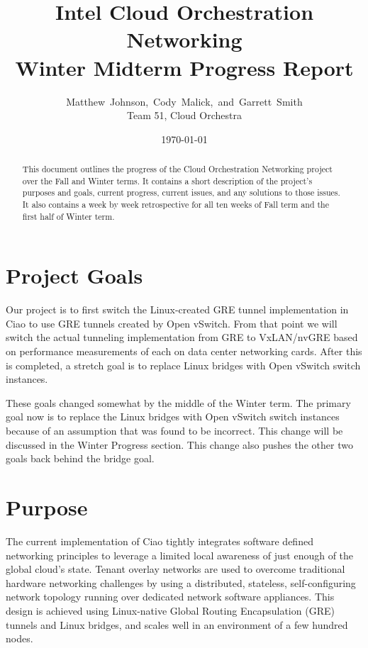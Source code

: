 \documentclass[10pt,onecolumn,journal,draftclsnofoot]{IEEEtran}
\begin{document}
\begin{titlepage}
	\title{Intel Cloud Orchestration Networking\\ Winter Midterm Progress Report}
	\author{Matthew~Johnson,~Cody~Malick,~and~Garrett~Smith\\
		Team 51, Cloud Orchestra}
	\date{\today}
	\maketitle
	\vspace{4cm}
	\begin{abstract}
		\noindent This document outlines the progress of the Cloud
		Orchestration Networking project over the Fall and Winter
		terms. It contains a short description of the project's purposes
		and goals, current progress, current issues, and any solutions
		to those issues. It also contains a week by week retrospective
		for all ten weeks of Fall term and the first half of Winter
		term. \end{abstract}

\end{titlepage}
\tableofcontents
\clearpage

\section{Project Goals}

Our project is to first switch the Linux-created GRE tunnel implementation in
Ciao to use GRE tunnels created by Open vSwitch. From that point we will switch
the actual tunneling implementation from GRE to VxLAN/nvGRE based on performance
measurements of each on data center networking cards. After this is completed, a
stretch goal is to replace Linux bridges with Open vSwitch switch instances.

These goals changed somewhat by the middle of the Winter term. The primary goal
now is to replace the Linux bridges with Open vSwitch switch instances because
of an assumption that was found to be incorrect. This change will be discussed
in the Winter Progress section. This change also pushes the other two goals back
behind the bridge goal.

\section{Purpose}

The current implementation of Ciao tightly integrates software defined
networking principles to leverage a limited local awareness of just enough of
the global cloud's state. Tenant overlay networks are used to overcome
traditional hardware networking challenges by using a distributed, stateless,
self-configuring network topology running over dedicated network software
appliances. This design is achieved using Linux-native Global Routing
Encapsulation (GRE) tunnels and Linux bridges, and scales well in an environment
of a few hundred nodes.
\end{document}
